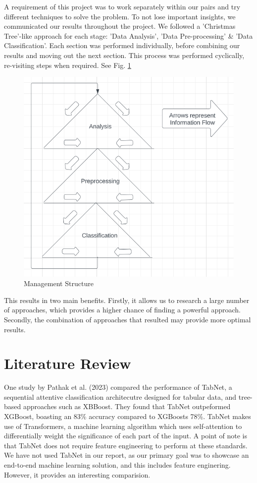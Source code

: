 \documentclass[conference]{IEEEtran}
\begin{document}
A requirement of this project was to work separately within our pairs and try different techniques to solve the problem. To not lose important insights, we communicated our results throughout the project. We followed a 'Christmas Tree'-like approach for each stage: 'Data Analysis', 'Data Pre-processing' \& 'Data Classification'. Each section was performed individually, before combining our results and moving out the next section. This process was performed cyclically, re-visiting steps when required. See Fig. \ref{fig:management_structure}

\begin{figure}[h]
    \centering
    \includegraphics[scale=0.3]{figures/ct_approach.png}
    \caption{Management Structure}
    \label{fig:management_structure}
\end{figure}

This results in two main benefits. Firstly, it allows us to research a large number of approaches, which provides a higher chance of finding a powerful approach. Secondly, the combination of approaches that resulted may provide more optimal results. 

\section{Literature Review}

One study by Pathak et al. (2023) \cite{pathak2023pump} compared the performance of TabNet, a sequential attentive classification architecutre designed for tabular data, and tree-based approaches such as XBBoost. They found that TabNet outpeformed XGBoost, boasting an 83\% accuracy compared to XGBoosts 78\%. TabNet makes use of Transformers, a machine learning algorithm which uses self-attention to differentially weight the significance of each part of the input. A point of note is that TabNet does not require feature engineering to perform at these standards. We have not used TabNet in our report, as our primary goal was to showcase an end-to-end machine learning solution, and this includes feature enginering. However, it provides an interesting comparision.
\end{document}
